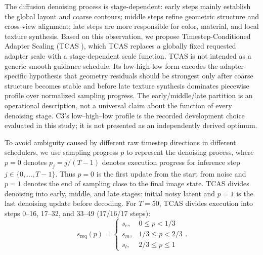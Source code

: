\documentclass[times,twocolumn,final]{elsarticle}
\providecommand{\DIFadd}[1]{{\protect\color{blue} \sf #1}} %
\providecommand{\DIFdel}[1]{{\protect\color{red} \scriptsize #1}} %
\providecommand{\DIFaddbegin}{} %
\providecommand{\DIFaddend}{} %
\providecommand{\DIFdelbegin}{} %
\providecommand{\DIFdelend}{} %
\begin{document}
\DIFdelbegin \DIFdel{The diffusion denoising process is stage-dependent: early steps mainly establish the global layout and coarse contours; middle steps refine geometric structure and cross-view alignment; late steps are more responsible for color, material, and local texture synthesis. Based on this observation, we propose Timestep-Conditioned Adapter Scaling (TCAS ), which }\DIFdelend \DIFaddbegin \DIFadd{TCAS }\DIFaddend replaces a globally fixed \DIFaddbegin \DIFadd{requested }\DIFaddend adapter scale with a \DIFdelbegin \DIFdel{stage-dependent scale function. TCAS is not intended as a generic smooth guidance schedule. Its low-high-low form encodes the adapter-specific hypothesis that geometry residuals should be strongest only after coarse structure becomes stable and before late texture synthesis dominates}\DIFdelend \DIFaddbegin \DIFadd{piecewise profile over normalized sampling progress. The early/middle/late partition is an operational description, not a universal claim about the function of every denoising stage. C3's low--high--low profile is the recorded development choice evaluated in this study; it is not presented as an independently derived optimum}\DIFaddend .

To avoid ambiguity caused by different raw timestep directions in different schedulers, \DIFdelbegin \DIFdel{we use sampling progress $p$ to represent the denoising process, where $p = 0$ denotes }\DIFdelend \DIFaddbegin \DIFadd{$p_j=j/(T-1)$ denotes execution progress for inference step $j\in\{0,\ldots,T-1\}$. Thus $p=0$ is the first update from }\DIFaddend the \DIFdelbegin \DIFdel{start from noise and $p = 1$ denotes the end of sampling close to the final image state. TCAS divides denoising into early, middle, and late stages:
}%
\DIFdelend \DIFaddbegin \DIFadd{initial noisy latent and $p=1$ is the last denoising update before decoding. For $T=50$, TCAS divides execution into steps 0--16, 17--32, and 33--49 (17/16/17 steps):
}\begin{equation}
s_{\mathrm{req}}(p) = \begin{cases} s_e, & 0 \leq p < 1/3 \\ s_m, & 1/3 \leq p < 2/3 \\ s_l, & 2/3 \leq p \leq 1 \end{cases}.
\label{eq:tcas}
\end{equation}\DIFaddend 
\end{document}
